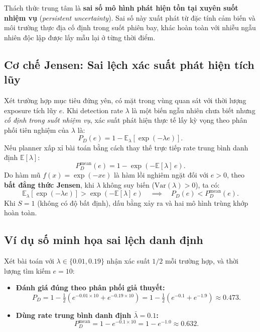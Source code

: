 \documentclass[12pt,a4paper]{article}
\begin{document}
Thách thức trung tâm là \textbf{sai số mô hình phát hiện tồn tại xuyên suốt nhiệm vụ} (\emph{persistent uncertainty}). Sai số này xuất phát từ đặc tính cảm biến và môi trường thực địa cố định trong suốt phiên bay, khác hoàn toàn với nhiễu ngẫu nhiên độc lập được lấy mẫu lại ở từng thời điểm.

\subsection{Cơ chế Jensen: Sai lệch xác suất phát hiện tích lũy}

Xét trường hợp mục tiêu đứng yên, có mặt trong vùng quan sát với thời lượng exposure tích lũy $e$. Khi detection rate $\lambda$ là một biến ngẫu nhiên chưa biết nhưng \emph{cố định trong suốt nhiệm vụ}, xác suất phát hiện thực tế lấy kỳ vọng theo phân phối tiên nghiệm của $\lambda$ là:
\begin{equation}
P_D(e) = 1 - \mathbb{E}_\lambda\left[\exp(-\lambda e)\right].
\end{equation}
Nếu planner xấp xỉ bài toán bằng cách thay thế trực tiếp rate trung bình danh định $\mathbb{E}[\lambda]$:
\begin{equation}
P_D^{\mathrm{mean}}(e) = 1 - \exp\left(-\mathbb{E}[\lambda]\,e\right).
\end{equation}
Do hàm mũ $f(x) = \exp(-x e)$ là hàm lồi nghiêm ngặt đối với $e > 0$, theo \textbf{bất đẳng thức Jensen}, khi $\lambda$ không suy biến ($\mathrm{Var}(\lambda) > 0$), ta có:
\begin{equation}
\mathbb{E}_\lambda\left[\exp(-\lambda e)\right] > \exp\left(-\mathbb{E}[\lambda]\,e\right)
\quad\implies\quad
P_D(e) < P_D^{\mathrm{mean}}(e).
\end{equation}
Khi $S=1$ (không có độ bất định), dấu bằng xảy ra và hai mô hình trùng khớp hoàn toàn.

\subsection{Ví dụ số minh họa sai lệch danh định}

Xét bài toán với $\lambda \in \{0.01, 0.19\}$ nhận xác suất $1/2$ mỗi trường hợp, và thời lượng tìm kiếm $e = 10$:
\begin{itemize}
    \item \textbf{Đánh giá đúng theo phân phối giả thuyết:}
    \[
    P_D = 1 - \tfrac{1}{2}\left(e^{-0.01 \times 10} + e^{-0.19 \times 10}\right) = 1 - \tfrac{1}{2}\left(e^{-0.1} + e^{-1.9}\right) \approx 0.473.
    \]
    \item \textbf{Dùng rate trung bình danh định $\bar\lambda = 0.1$:}
    \[
    P_D^{\mathrm{mean}} = 1 - e^{-0.1 \times 10} = 1 - e^{-1.0} \approx 0.632.
    \]
\end{itemize}
\end{document}
